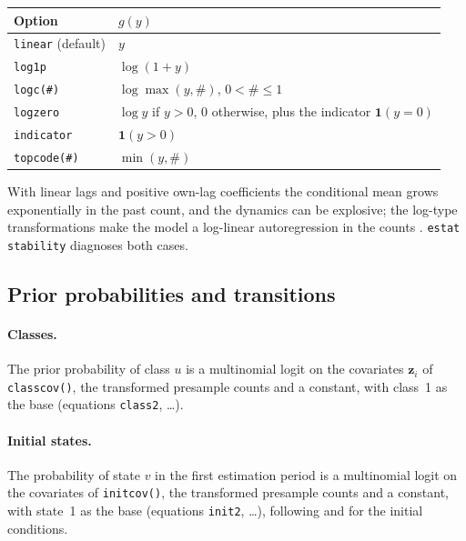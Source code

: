 \documentclass[11pt,a4paper]{article}
\newcommand{\cmd}[1]{\texttt{#1}}
\newcommand{\zv}{\mathbf z}
\begin{document}
\begin{center}
\begin{tabular}{ll}
\toprule
Option & $g(y)$\\
\midrule
\cmd{linear} (default) & $y$\\
\cmd{log1p} & $\log(1+y)$\\
\cmd{logc(\#)} & $\log\max(y,\#)$, $0<\#\le1$\\
\cmd{logzero} & $\log y$ if $y>0$, $0$ otherwise, plus the indicator $\mathbf 1(y=0)$\\
\cmd{indicator} & $\mathbf 1(y>0)$\\
\cmd{topcode(\#)} & $\min(y,\#)$\\
\bottomrule
\end{tabular}
\end{center}

With linear lags and positive own-lag coefficients the conditional mean grows exponentially in the past
count, and the dynamics can be explosive; the log-type transformations make the model a log-linear
autoregression in the counts \citep{blundell2002}. \cmd{estat stability} diagnoses both cases.

\subsection{Prior probabilities and transitions}

\paragraph{Classes.} The prior probability of class $u$ is a multinomial logit on the covariates
$\zv_{i}$ of \cmd{classcov()}, the transformed presample counts and a constant, with class~1 as the base
(equations \cmd{class2}, \dots).

\paragraph{Initial states.} The probability of state $v$ in the first estimation period is a multinomial
logit on the covariates of \cmd{initcov()}, the transformed presample counts and a constant, with
state~1 as the base (equations \cmd{init2}, \dots), following \citet{heckman1981} and
\citet{wooldridge2005} for the initial conditions.
\end{document}
